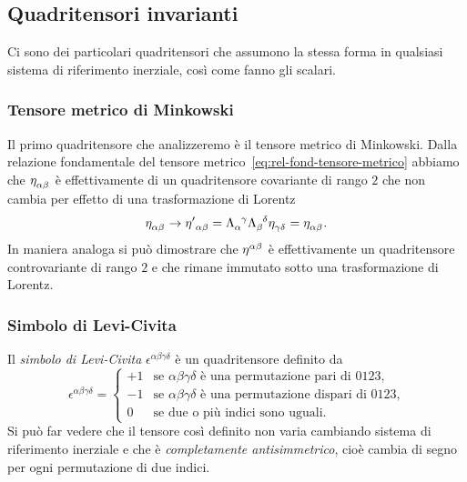 \subsection{Quadritensori invarianti}
\label{sec:tensori-invarianti-minkowski}

Ci sono dei particolari quadritensori che assumono la stessa forma in qualsiasi
sistema di riferimento inerziale, così come fanno gli scalari.

\subsubsection{Tensore metrico di Minkowski}
\label{sec:tensore-metrico-minkowski}

Il primo quadritensore che analizzeremo è il tensore metrico di Minkowski.
Dalla relazione fondamentale del tensore
metrico~\eqref{eq:rel-fond-tensore-metrico} abbiamo che
$\tensor{\eta}{_{\alpha\beta}}$ è effettivamente di un quadritensore covariante
di rango $2$ che non cambia per effetto di una trasformazione di Lorentz
\begin{equation}
  \tensor{\eta}{_{\alpha\beta}} \to \tensor{{\eta'}}{_{\alpha\beta}} =
  \tensor{\Lambda}{_{\alpha}^{\gamma}} \tensor{\Lambda}{_{\beta}^{\delta}}
  \tensor{\eta}{_{\gamma\delta}} = \tensor{\eta}{_{\alpha\beta}}.
\end{equation}
In maniera analoga si può dimostrare che $\tensor{\eta}{^{\alpha\beta}}$ è
effettivamente un quadritensore controvariante di rango $2$ e che rimane
immutato sotto una trasformazione di Lorentz.

\subsubsection{Simbolo di Levi-Civita}
\label{sec:simbolo-levi-civita}

Il \emph{simbolo di Levi-Civita}
$\epsilon^{\alpha\beta\gamma\delta}$ è un quadritensore definito da
\begin{equation}
  \epsilon^{\alpha\beta\gamma\delta} =
  \begin{cases}
    +1 & \text{se $\alpha\beta\gamma\delta$ è una permutazione pari di $0123$,}
    \\
    -1 & \text{se $\alpha\beta\gamma\delta$ è una permutazione dispari di
      $0123$,} \\
    0 & \text{se due o più indici sono uguali.}
  \end{cases}
\end{equation}
Si può far vedere che il tensore così definito non varia cambiando sistema di
riferimento inerziale e che è \emph{completamente antisimmetrico}, cioè cambia
di segno per ogni permutazione di due indici.

